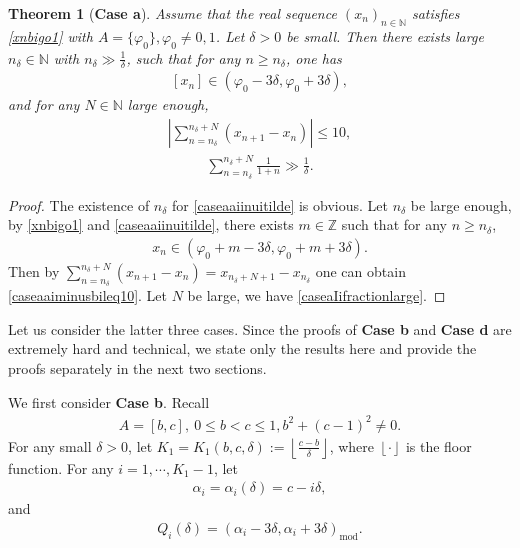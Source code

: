 \documentclass[12pt]{amsart}
\newcommand{\abs}[1]{\left\lvert #1 \right\rvert}
\theoremstyle{plain}
\newtheorem{theorem}{Theorem}[section]
\theoremstyle{definition}
\begin{document}
\begin{theorem}[\textbf{Case a}]\label{casea}
Assume that the real sequence $(x_n)_{n\in\mathbb{N}}$ satisfies \eqref{xnbigo1} with $A=\{\varphi_0\},\varphi_0\neq 0,1$. Let $\delta>0$ be small.  Then there exists large $n_\delta\in\mathbb{N}$ with $n_\delta\gg \frac{1}{\delta}$, such that 
for any $n\geq n_\delta$, one has
\begin{align}
	\left[x_n\right]\in (\varphi_0-3\delta,\varphi_0+3\delta),\label{caseaaiinuitilde}
\end{align}
and for any  $N\in\mathbb{N}$ large enough,
\begin{align}
	\abs{\sum_{n=n_\delta}^{n_\delta+N}(x_{n+1}-x_n)}\leq 10,\label{caseaaiminusbileq10}
\end{align}
\begin{align}
\sum_{n=n_\delta}^{n_\delta+N}\frac{1}{1+n}\gg \frac{1}{\delta}.\label{caseaIifractionlarge}
\end{align}
\end{theorem}
\begin{proof}
The existence of $n_\delta$ for \eqref{caseaaiinuitilde} is obvious. Let $n_\delta$ be large enough, by \eqref{xnbigo1} and \eqref{caseaaiinuitilde}, there exists $m\in \mathbb{Z}$ such that for any $n\geq n_\delta$, 
\begin{align}
x_n\in (\varphi_0+m-3\delta,\varphi_0+m+3\delta).\nonumber
\end{align}
Then by
$\sum_{n=n_\delta}^{n_\delta+N}(x_{n+1}-x_n)=x_{n_\delta+N+1}-x_{n_\delta}$ one can obtain \eqref{caseaaiminusbileq10}. Let $N$ be large, we have \eqref{caseaIifractionlarge}.
\end{proof}



Let us consider the latter three cases. Since the proofs of \textbf{Case b} and \textbf{Case d} are extremely hard and technical, we state only the results here and provide the proofs separately in the next two sections.

We first consider \textbf{Case b}. Recall
\begin{align}
	A=[b,c],\ 0\leq b<c\leq 1, b^2+(c-1)^2\neq 0.\nonumber
\end{align}
For any small $\delta>0$, let $K_1=K_1(b,c,\delta):=\left \lfloor \frac{c-b}{\delta} \right \rfloor$, where $\left \lfloor \cdot \right \rfloor$ is the floor function. For any $i=1,\cdots,K_1-1$, let
\begin{align}
	\alpha_i=\alpha_i(\delta)=c-i\delta,\label{dealphai}
\end{align}
and
\begin{align}
	Q_i(\delta)=(\alpha_i-3\delta,\alpha_i+3\delta)_{\mathrm{mod}}.\label{deofVi}
\end{align}
\end{document}
